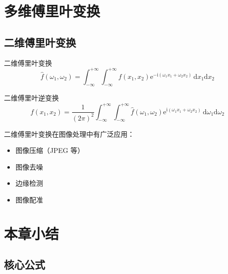 \section{多维傅里叶变换}

\subsection{二维傅里叶变换}

\begin{dingliyi}{}{二维傅里叶变换}
\begin{equation}
    \hat{f}(\omega_1, \omega_2) = \int_{-\infty}^{+\infty}\int_{-\infty}^{+\infty} f(x_1, x_2)\mathrm{e}^{-\mathrm{i}(\omega_1 x_1 + \omega_2 x_2)}\,\mathrm{d}x_1\mathrm{d}x_2
\end{equation}
\end{dingliyi}

\begin{dingliyi}{}{二维傅里叶逆变换}
\begin{equation}
    f(x_1, x_2) = \frac{1}{(2\pi)^2}\int_{-\infty}^{+\infty}\int_{-\infty}^{+\infty} \hat{f}(\omega_1, \omega_2)\mathrm{e}^{\mathrm{i}(\omega_1 x_1 + \omega_2 x_2)}\,\mathrm{d}\omega_1\mathrm{d}\omega_2
\end{equation}
\end{dingliyi}

\begin{wulibj}[应用：图像处理]
二维傅里叶变换在图像处理中有广泛应用：
\begin{itemize}
    \item 图像压缩（JPEG 等）
    \item 图像去噪
    \item 边缘检测
    \item 图像配准
\end{itemize}
\end{wulibj}

\section{本章小结}

\subsection{核心公式}

